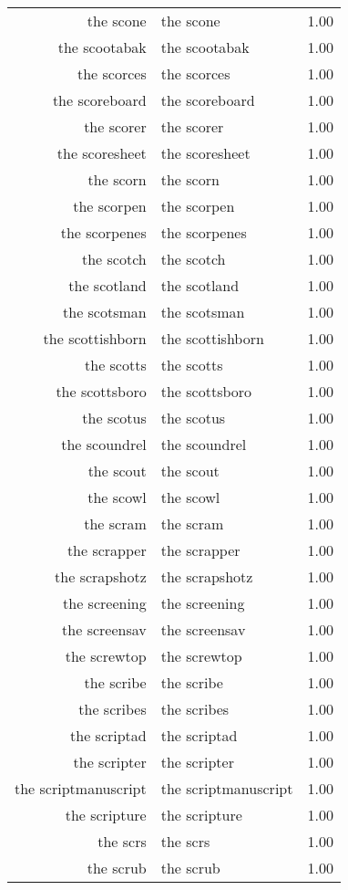 \begin{table}[ht]
\begin{tabular}{rlr}
  the scone & the scone & 1.00 \\ 
  the scootabak & the scootabak & 1.00 \\ 
  the scorces & the scorces & 1.00 \\ 
  the scoreboard & the scoreboard & 1.00 \\ 
  the scorer & the scorer & 1.00 \\ 
  the scoresheet & the scoresheet & 1.00 \\ 
  the scorn & the scorn & 1.00 \\ 
  the scorpen & the scorpen & 1.00 \\ 
  the scorpenes & the scorpenes & 1.00 \\ 
  the scotch & the scotch & 1.00 \\ 
  the scotland & the scotland & 1.00 \\ 
  the scotsman & the scotsman & 1.00 \\ 
  the scottishborn & the scottishborn & 1.00 \\ 
  the scotts & the scotts & 1.00 \\ 
  the scottsboro & the scottsboro & 1.00 \\ 
  the scotus & the scotus & 1.00 \\ 
  the scoundrel & the scoundrel & 1.00 \\ 
  the scout & the scout & 1.00 \\ 
  the scowl & the scowl & 1.00 \\ 
  the scram & the scram & 1.00 \\ 
  the scrapper & the scrapper & 1.00 \\ 
  the scrapshotz & the scrapshotz & 1.00 \\ 
  the screening & the screening & 1.00 \\ 
  the screensav & the screensav & 1.00 \\ 
  the screwtop & the screwtop & 1.00 \\ 
  the scribe & the scribe & 1.00 \\ 
  the scribes & the scribes & 1.00 \\ 
  the scriptad & the scriptad & 1.00 \\ 
  the scripter & the scripter & 1.00 \\ 
  the scriptmanuscript & the scriptmanuscript & 1.00 \\ 
  the scripture & the scripture & 1.00 \\ 
  the scrs & the scrs & 1.00 \\ 
  the scrub & the scrub & 1.00 \\ 

\end{tabular}
\end{table}
